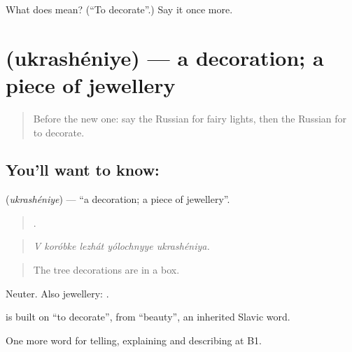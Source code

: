 \begin{tcolorbox}[breakable,colback=teal!4,colframe=teal!35!black,title={Before you move on}]
What does  mean? (\textquotedblleft{}To decorate\textquotedblright{}.) Say it once more.
\end{tcolorbox}
\section[\texorpdfstring{\ru{украшение} (ukrashéniye)}{украшение (ukrashéniye)}]{ (ukrashéniye) — a decoration; a piece of jewellery}

\label{lesson:RU-C313-ukrasheniye}



\begin{quote}
Before the new one: say the Russian for fairy lights, then the Russian for to decorate.
\end{quote}

\subsection*{You'll want to know: }
\textbf{} (\emph{ukrashéniye}) — \textquotedblleft{}a decoration; a piece of jewellery\textquotedblright{}.

\begin{quote}
    .
\end{quote}

\begin{quote}
\emph{V koróbke lezhát yólochnyye ukrashéniya.}
\end{quote}

\begin{quote}
The tree decorations are in a box.
\end{quote}

Neuter. Also jewellery: \emph{ }.

\begin{cousinweb}
\emph{} is built on \emph{} \textquotedblleft{}to decorate\textquotedblright{}, from \emph{} \textquotedblleft{}beauty\textquotedblright{}, an inherited Slavic word.
\end{cousinweb}

\begin{grammarlens}[title={What you've built}]
One more word for telling, explaining and describing at B1.
\end{grammarlens}

